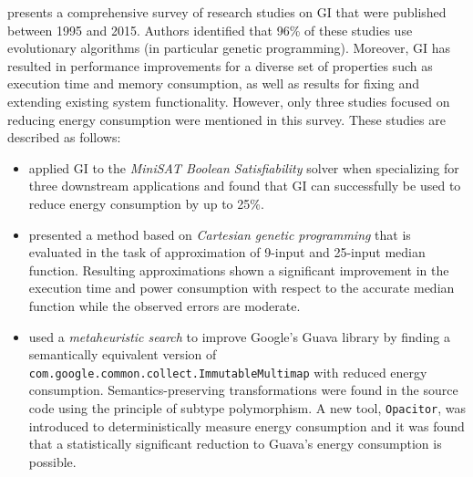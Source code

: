 \vspace{.5em}

%

\cite{DBLP:journals/tec/PetkeHHLWW18} presents a comprehensive survey of  
research studies on GI that were published between 1995 and 2015.
Authors identified 
that 96\% of these studies use evolutionary algorithms (in particular genetic programming). Moreover, GI has resulted in performance improvements for a diverse set of properties such as execution time and memory consumption, as well as results for fixing and extending existing system functionality. However, only three studies focused on reducing energy consumption were mentioned in this survey. These studies are described as follows:

\begin{itemize}
    \item \cite{DBLP:conf/gecco/BrucePH15} applied GI to the \textit{MiniSAT Boolean Satisfiability} solver when specializing for three downstream applications and found that GI can successfully be used to reduce energy consumption by up to 25\%.
    
    \item \cite{DBLP:conf/gecco/MrazekVS15} presented a method based on \textit{Cartesian genetic programming} that is evaluated in the task of approximation of 9-input and 25-input median function. Resulting approximations shown a significant improvement in the execution time and power consumption with respect to the accurate median function while the observed errors are moderate.
    
    \item \cite{DBLP:conf/ssbse/BurlesBBKSV15} used a \textit{metaheuristic search} to improve Google’s Guava library by finding a semantically equivalent version of \texttt{com.google.common.collect.ImmutableMultimap} with reduced energy consumption. Semantics-preserving transformations were found in the source code using the principle of subtype polymorphism. A new tool, \texttt{Opacitor}, was introduced to deterministically measure energy consumption and it was found that a statistically significant reduction to Guava’s energy consumption is possible. 
\end{itemize}


